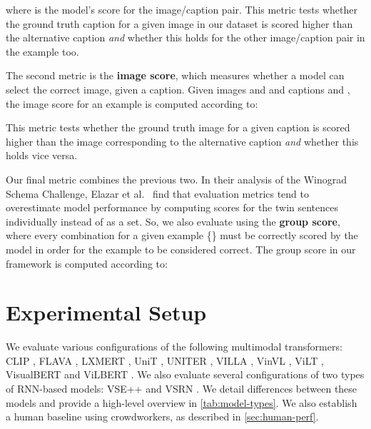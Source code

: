 \documentclass[10pt,twocolumn,letterpaper]{article}
\begin{document}
where  is the model's score for the image/caption pair.
This metric tests whether the ground truth caption for a given image in our dataset is scored higher than the alternative caption \textit{and} whether this holds for the other image/caption pair in the example too.



The second metric is the \textbf{image score}, which measures whether a model can select the correct image, given a caption.
Given images  and  and captions  and , the image score for an example is computed according to:

This metric tests whether the ground truth image for a given caption is scored higher than the image corresponding to the alternative caption \textit{and} whether this holds vice versa.

Our final metric combines the previous two. In their analysis of the Winograd Schema Challenge, Elazar et al.~\cite{elazar2021back} find that evaluation metrics tend to overestimate model performance by computing scores for the twin sentences individually instead of as a set. So, we also evaluate using the \textbf{group score}, where every combination for a given example \{\} must be correctly scored by the model in order for the example to be considered correct.
The group score in our framework is computed according to:




\section{Experimental Setup}

We evaluate various configurations of the following multimodal transformers: CLIP \cite{radford2021clip}, FLAVA \cite{singh2022flava}, LXMERT \cite{tan2020lxmert}, UniT \cite{hu2021unit}, UNITER \cite{chen2020uniter}, VILLA \cite{gan2020villa}, VinVL \cite{zhang2021vinvl}, ViLT \cite{kim2021vilt}, VisualBERT \cite{li2019visualbert} and ViLBERT \cite{lu2019vilbert}. We also evaluate several configurations of two types of RNN-based models: VSE++ \cite{faghri2018vse} and VSRN \cite{li2019vsrn}.
We detail differences between these models and provide a high-level overview in \cref{tab:model-types}.
We also establish a human baseline using crowdworkers, as described in \cref{sec:human-perf}.
\end{document}
